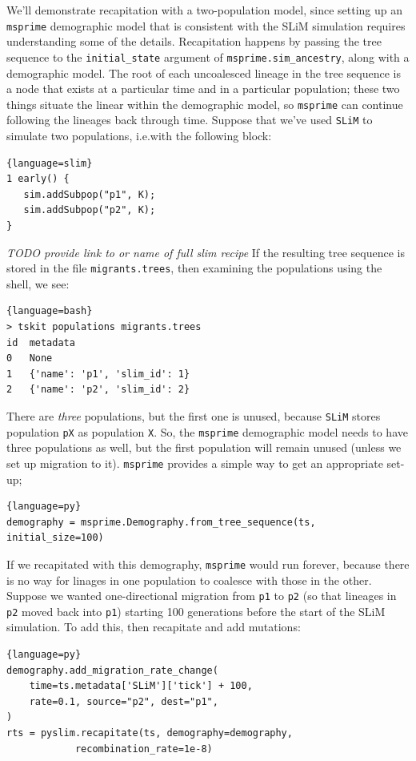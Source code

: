 \documentclass[12pt]{article}
\newcommand{\msprime}[0]{\texttt{msprime}\xspace}
\newcommand{\slim}[0]{\texttt{SLiM}\xspace}
\newcommand*{\ie}{i.e.\xcomma}
\newcommand{\comment}[1]{\textit{\color{green} #1}}
\newcommand{\p}[1]{\texttt{p#1}}
\begin{document}
We'll demonstrate recapitation with a two-population model,
since setting up an \msprime demographic model that is consistent with the SLiM simulation
requires understanding some of the details.
Recapitation happens by passing the tree sequence to the
\texttt{initial\_state} argument of \texttt{msprime.sim\_ancestry},
along with a demographic model.
The root of each uncoalesced lineage in the tree sequence is a node
that exists at a particular time and in a particular population;
these two things situate the linear within the demographic model,
so \msprime can continue following the lineages back through time.
Suppose that we've used \slim to simulate two populations, \ie with the following block:
\begin{lstlisting}{language=slim}
1 early() {
   sim.addSubpop("p1", K);
   sim.addSubpop("p2", K);
}
\end{lstlisting}
\comment{TODO provide link to or name of full slim recipe}
If the resulting tree sequence is stored in the file \texttt{migrants.trees},
then examining the populations using the shell, we see:
\begin{lstlisting}{language=bash}
> tskit populations migrants.trees
id	metadata
0	None
1	{'name': 'p1', 'slim_id': 1}
2	{'name': 'p2', 'slim_id': 2}
\end{lstlisting}
There are \emph{three} populations, but the first one is unused,
because \slim stores population \texttt{pX} as population \texttt{X}.
So, the \msprime demographic model needs to have three populations as well,
but the first population will remain unused (unless we set up migration to it).
\msprime provides a simple way to get an appropriate set-up;
\begin{lstlisting}{language=py}
demography = msprime.Demography.from_tree_sequence(ts, initial_size=100)
\end{lstlisting}
If we recapitated with this demography,
\msprime would run forever,
because there is no way for linages in one population
to coalesce with those in the other.
Suppose we wanted one-directional migration from \p1 to \p2
(so that lineages in \p2 moved back into \p1)
starting 100 generations before the start of the SLiM simulation.
To add this, then recapitate and add mutations:
\begin{lstlisting}{language=py}
demography.add_migration_rate_change(
    time=ts.metadata['SLiM']['tick'] + 100,
    rate=0.1, source="p2", dest="p1",
)
rts = pyslim.recapitate(ts, demography=demography,
            recombination_rate=1e-8)
\end{lstlisting}
\end{document}
